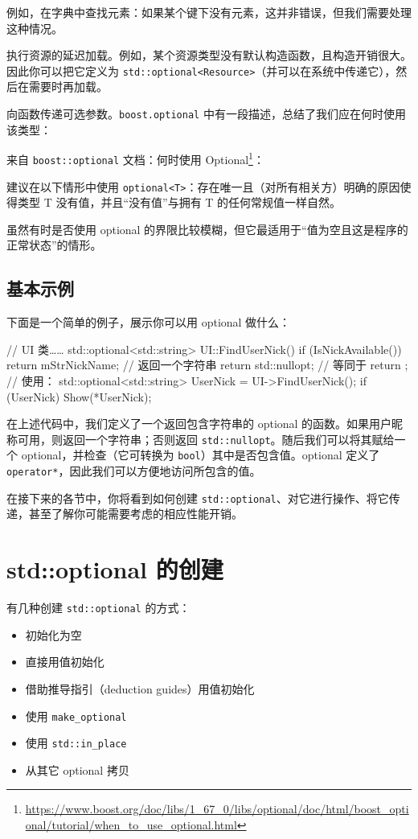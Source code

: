 例如，在字典中查找元素：如果某个键下没有元素，这并非错误，但我们需要处理这种情况。

执行资源的延迟加载。例如，某个资源类型没有默认构造函数，且构造开销很大。因此你可以把它定义为 \texttt{std::optional<Resource>}（并可以在系统中传递它），然后在需要时再加载。

向函数传递可选参数。\texttt{boost.optional} 中有一段描述，总结了我们应在何时使用该类型：

来自 \texttt{boost::optional} 文档：何时使用 Optional\footnote{\url{https://www.boost.org/doc/libs/1_67_0/libs/optional/doc/html/boost_optional/tutorial/when_to_use_optional.html}}：

\begin{myQuote}
建议在以下情形中使用 \texttt{optional<T>}：存在唯一且（对所有相关方）明确的原因使得类型 T 没有值，并且“没有值”与拥有 T 的任何常规值一样自然。
\end{myQuote}

虽然有时是否使用 optional 的界限比较模糊，但它最适用于“值为空且这是程序的正常状态”的情形。

\subsection{基本示例}
下面是一个简单的例子，展示你可以用 optional 做什么：

\begin{codebox}[cpp]
// UI 类……
std::optional<std::string> UI::FindUserNick()
{
if (IsNickAvailable())
return mStrNickName; // 返回一个字符串
return std::nullopt; // 等同于 return { };
}
// 使用：
std::optional<std::string> UserNick = UI->FindUserNick();
if (UserNick)
Show(*UserNick);
\end{codebox}

在上述代码中，我们定义了一个返回包含字符串的 optional 的函数。如果用户昵称可用，则返回一个字符串；否则返回 \texttt{std::nullopt}。随后我们可以将其赋给一个 optional，并检查（它可转换为 \texttt{bool}）其中是否包含值。optional 定义了 \texttt{operator*}，因此我们可以方便地访问所包含的值。

在接下来的各节中，你将看到如何创建 \texttt{std::optional}、对它进行操作、将它传递，甚至了解你可能需要考虑的相应性能开销。

\section{std::optional 的创建}
有几种创建 \texttt{std::optional} 的方式：
\begin{itemize}
\item 初始化为空
\item 直接用值初始化
\item 借助推导指引（deduction guides）用值初始化
\item 使用 \texttt{make\_optional}
\item 使用 \texttt{std::in\_place}
\item 从其它 optional 拷贝
\end{itemize}

